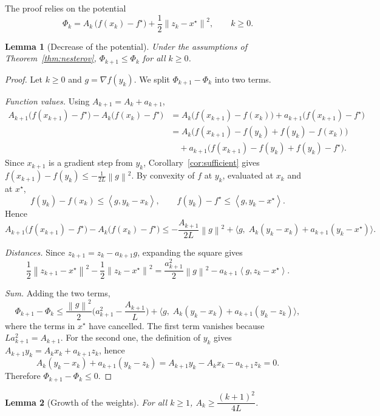 \documentclass[11pt,a4paper]{article}
\newtheorem{lemma}{Lemma}
\theoremstyle{definition}
\theoremstyle{remark}
\newcommand{\norm}[1]{\left\lVert #1 \right\rVert}
\newcommand{\ip}[2]{\left\langle #1, #2 \right\rangle}
\begin{document}
The proof relies on the potential
\[
\Phi_k = A_k\,\big(f(x_k) - f^\star\big) + \frac12 \norm{z_k - x^\star}^2 , \qquad k \ge 0 .
\]

\begin{lemma}[Decrease of the potential]\label{lem:potential}
Under the assumptions of Theorem~\ref{thm:nesterov}, $\Phi_{k+1} \le \Phi_k$ for all $k \ge 0$.
\end{lemma}

\begin{proof}
Let $k \ge 0$ and $g = \nabla f(y_k)$. We split $\Phi_{k+1} - \Phi_k$ into two terms.

\emph{Function values.} Using $A_{k+1} = A_k + a_{k+1}$,
\begin{align*}
A_{k+1}\big(f(x_{k+1}) - f^\star\big) - A_k\big(f(x_k) - f^\star\big)
&= A_k\big(f(x_{k+1}) - f(x_k)\big) + a_{k+1}\big(f(x_{k+1}) - f^\star\big) \\
&= A_k\big(f(x_{k+1}) - f(y_k) + f(y_k) - f(x_k)\big) \\
&\quad + a_{k+1}\big(f(x_{k+1}) - f(y_k) + f(y_k) - f^\star\big).
\end{align*}
Since $x_{k+1}$ is a gradient step from $y_k$, Corollary~\ref{cor:sufficient} gives $f(x_{k+1}) - f(y_k) \le -\frac{1}{2L}\norm{g}^2$. By convexity of $f$ at $y_k$, evaluated at $x_k$ and at $x^\star$,
\[
f(y_k) - f(x_k) \le \ip{g}{y_k - x_k}, \qquad f(y_k) - f^\star \le \ip{g}{y_k - x^\star}.
\]
Hence
\[
A_{k+1}\big(f(x_{k+1}) - f^\star\big) - A_k\big(f(x_k) - f^\star\big) \le -\frac{A_{k+1}}{2L}\norm{g}^2 + \Big\langle g,\; A_k(y_k - x_k) + a_{k+1}(y_k - x^\star) \Big\rangle .
\]

\emph{Distances.} Since $z_{k+1} = z_k - a_{k+1} g$, expanding the square gives
\[
\frac12\norm{z_{k+1} - x^\star}^2 - \frac12\norm{z_k - x^\star}^2 = \frac{a_{k+1}^2}{2}\norm{g}^2 - a_{k+1}\ip{g}{z_k - x^\star}.
\]

\emph{Sum.} Adding the two terms,
\[
\Phi_{k+1} - \Phi_k \le \frac{\norm{g}^2}{2}\Big(a_{k+1}^2 - \frac{A_{k+1}}{L}\Big) + \Big\langle g,\; A_k(y_k - x_k) + a_{k+1}(y_k - z_k) \Big\rangle ,
\]
where the terms in $x^\star$ have cancelled. The first term vanishes because $L a_{k+1}^2 = A_{k+1}$. For the second one, the definition of $y_k$ gives $A_{k+1} y_k = A_k x_k + a_{k+1} z_k$, hence
\[
A_k(y_k - x_k) + a_{k+1}(y_k - z_k) = A_{k+1} y_k - A_k x_k - a_{k+1} z_k = 0 .
\]
Therefore $\Phi_{k+1} - \Phi_k \le 0$.
\end{proof}

\begin{lemma}[Growth of the weights]\label{lem:Ak}
For all $k \ge 1$, $A_k \ge \dfrac{(k+1)^2}{4L}$.
\end{lemma}
\end{document}
